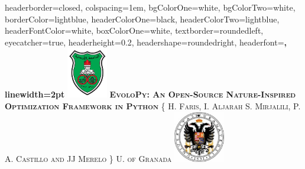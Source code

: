 \documentclass[landscape,a0paper,fontscale=0.22]{baposter} %
\begin{document}
\begin{poster}
{
headerborder=closed, %
colspacing=1em, %
bgColorOne=white, %
bgColorTwo=white, %
borderColor=lightblue, %
headerColorOne=black, %
headerColorTwo=lightblue, %
headerFontColor=white, %
boxColorOne=white, %
textborder=roundedleft, %
eyecatcher=true, %
headerheight=0.2\textheight, %
headershape=roundedright, %
headerfont=\Large\bf\textsc, %
linewidth=2pt %
}
%
{\includegraphics[height=6em]{julogo}} %
{\bf\textsc{EvoloPy: An Open-Source Nature-Inspired Optimization Framework in Python}\vspace{0.5em}} %
{\textsc{\{ H. Faris, I. Aljarah S. Mirjalili, P. A. Castillo and JJ Merelo \} \hspace{12pt}  U. of Granada}} %
{\includegraphics[height=6em]{granadalogo}} %


\end{poster}
\end{document}
